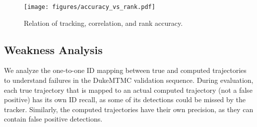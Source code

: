 \documentclass[10pt,twocolumn,letterpaper]{article}
\begin{document}
\begin{figure}[t]
	\centering
\texttt{[image: figures/accuracy\_vs\_rank.pdf]}
	\caption{Relation of tracking, correlation, and rank accuracy.}
	\label{fig:tracking_vs_rank}
\end{figure}





\subsection{Weakness Analysis}

We analyze the one-to-one ID mapping between true and computed trajectories to understand failures in the DukeMTMC validation sequence. During evaluation, each true trajectory that is mapped to an actual computed trajectory (not a false positive) has its own ID recall, as some of its detections could be missed by the tracker. Similarly, the computed trajectories have their own precision, as they can contain false positive detections. 
\end{document}
